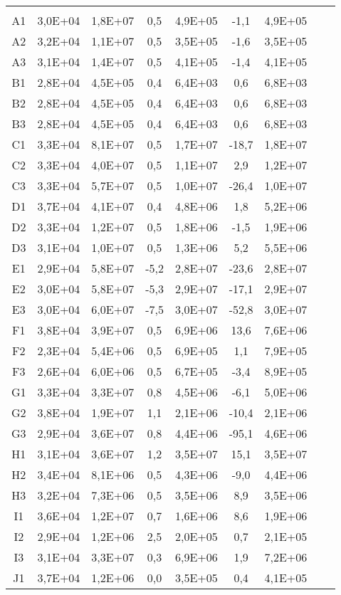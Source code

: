 \begin{center}
\begin{longtable}{ccccccccc}
\toprule
\endhead
\midrule \\ %
\endfoot
\bottomrule 
\endlastfoot
A1&3,0E+04&1,8E+07&0,5&4,9E+05&-1,1&4,9E+05\\
A2&3,2E+04&1,1E+07&0,5&3,5E+05&-1,6&3,5E+05\\
A3&3,1E+04&1,4E+07&0,5&4,1E+05&-1,4&4,1E+05\\
B1&2,8E+04&4,5E+05&0,4&6,4E+03&0,6&6,8E+03\\
B2&2,8E+04&4,5E+05&0,4&6,4E+03&0,6&6,8E+03\\
B3&2,8E+04&4,5E+05&0,4&6,4E+03&0,6&6,8E+03\\
C1&3,3E+04&8,1E+07&0,5&1,7E+07&-18,7&1,8E+07\\
C2&3,3E+04&4,0E+07&0,5&1,1E+07&2,9&1,2E+07\\
C3&3,3E+04&5,7E+07&0,5&1,0E+07&-26,4&1,0E+07\\
D1&3,7E+04&4,1E+07&0,4&4,8E+06&1,8&5,2E+06\\
D2&3,3E+04&1,2E+07&0,5&1,8E+06&-1,5&1,9E+06\\
D3&3,1E+04&1,0E+07&0,5&1,3E+06&5,2&5,5E+06\\
E1&2,9E+04&5,8E+07&-5,2&2,8E+07&-23,6&2,8E+07\\
E2&3,0E+04&5,8E+07&-5,3&2,9E+07&-17,1&2,9E+07\\
E3&3,0E+04&6,0E+07&-7,5&3,0E+07&-52,8&3,0E+07\\
F1&3,8E+04&3,9E+07&0,5&6,9E+06&13,6&7,6E+06\\
F2&2,3E+04&5,4E+06&0,5&6,9E+05&1,1&7,9E+05\\
F3&2,6E+04&6,0E+06&0,5&6,7E+05&-3,4&8,9E+05\\
G1&3,3E+04&3,3E+07&0,8&4,5E+06&-6,1&5,0E+06\\
G2&3,8E+04&1,9E+07&1,1&2,1E+06&-10,4&2,1E+06\\
G3&2,9E+04&3,6E+07&0,8&4,4E+06&-95,1&4,6E+06\\
H1&3,1E+04&3,6E+07&1,2&3,5E+07&15,1&3,5E+07\\
H2&3,4E+04&8,1E+06&0,5&4,3E+06&-9,0&4,4E+06\\
H3&3,2E+04&7,3E+06&0,5&3,5E+06&8,9&3,5E+06\\
I1&3,6E+04&1,2E+07&0,7&1,6E+06&8,6&1,9E+06\\
I2&2,9E+04&1,2E+06&2,5&2,0E+05&0,7&2,1E+05\\
I3&3,1E+04&3,3E+07&0,3&6,9E+06&1,9&7,2E+06\\
J1&3,7E+04&1,2E+06&0,0&3,5E+05&0,4&4,1E+05\\

\end{longtable}
\end{center}
